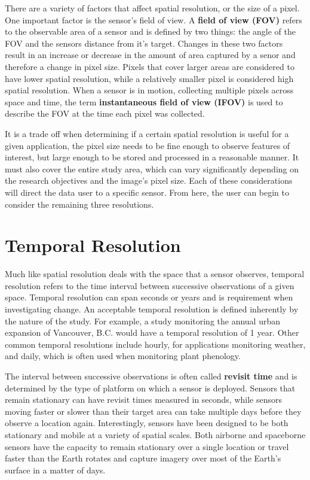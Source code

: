 \documentclass[
]{book}
\begin{document}
There are a variety of factors that affect spatial resolution, or the
size of a pixel. One important factor is the sensor's field of view. A \textbf{field of view (FOV)} refers to the observable area of a sensor and is defined by two things: the angle of the FOV and the sensors distance from it's target. Changes in these two factors result in an increase or decrease in the amount of area captured by a senor and therefore a change in pixel size. Pixels that cover larger areas are considered to have lower spatial resolution, while a relatively smaller pixel is considered high spatial resolution. When a sensor is in motion, collecting multiple pixels across space and time, the term \textbf{instantaneous field of view (IFOV)} is used to describe the FOV at the time each pixel was collected.

It is a trade off when determining if a certain spatial resolution is useful for a given application, the pixel size needs to be fine enough to observe features of interest, but large enough to be stored and processed in a reasonable manner. It must also cover the entire study area, which can vary significantly depending on the research objectives and the image's pixel size. Each of these considerations will direct the data user to a specific sensor. From here, the user can begin to consider the remaining three resolutions.

\section{Temporal Resolution}\label{temporal-resolution}

Much like spatial resolution deals with the space that a sensor observes, temporal resolution refers to the time interval between successive observations of a given space. Temporal resolution can span seconds or years and is requirement when investigating change. An acceptable temporal resolution is defined inherently by the nature of the study. For example, a study monitoring the annual urban expansion of Vancouver, B.C. would have a temporal resolution of 1 year. Other common temporal resolutions include hourly, for applications monitoring weather, and daily, which is often used when monitoring plant phenology.

The interval between successive observations is often called \textbf{revisit time} and is determined by the type of platform on which a sensor is deployed. Sensors that remain stationary can have revisit times measured in seconds, while sensors moving faster or slower than their target area can take multiple days before they observe a location again. Interestingly, sensors have been designed to be both stationary and mobile at a variety of spatial scales. Both airborne and spaceborne sensors have the capacity to remain stationary over a single location or travel faster than the Earth rotates and capture imagery over most of the Earth's surface in a matter of days.
\end{document}

